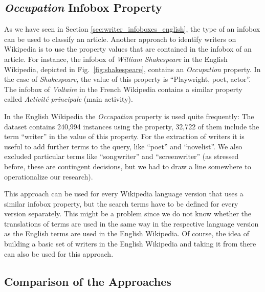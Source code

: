 \documentclass[a4paper,12pt]{scrartcl}
\begin{document}
\subsection{\emph{Occupation} Infobox Property}\label{sec:infobox_properties}

As we have seen in Section \ref{sec:writer_infoboxes_english},
the type of an infobox can be used to classify an article. Another
approach to identify writers on Wikipedia is to use the property
values that are contained in the infobox of an article. For instance,
the infobox of \emph{William Shakespeare} in the English Wikipedia,
depicted in Fig.~\ref{fig:shakespeare}, contains an \emph{Occupation}
property. In the case of \emph{Shakespeare}, the value of this
property is ``Playwright, poet, actor''. The infobox of
\emph{Voltaire} in the French Wikipedia contains a similar property
called \emph{Activité principale} (main activity).

In the English Wikipedia the \emph{Occupation} property is used quite
frequently: The  dataset contains 240,994
instances using the property, 32,722 of them include the term
``writer'' in the value of this property. For the extraction of
writers it is useful to add further terms to the query, like ``poet''
and ``novelist''. We also excluded particular terms like
``songwriter'' and ``screenwriter'' (as stressed before, these
are contingent decisions, but we had to draw a line somewhere
to operationalize our research).

This approach can be used for every Wikipedia language version that
uses a similar infobox property, but the search terms have to be
defined for every version separately. This might be a problem since we
do not know whether the translations of terms are used in the same way
in the respective language version as the English terms are used in
the English Wikipedia. Of course, the idea of building a basic set of
writers in the English Wikipedia and taking it from there can also be
used for this approach.


\subsection{Comparison of the Approaches}\label{sec:choosing_approach}
\end{document}
